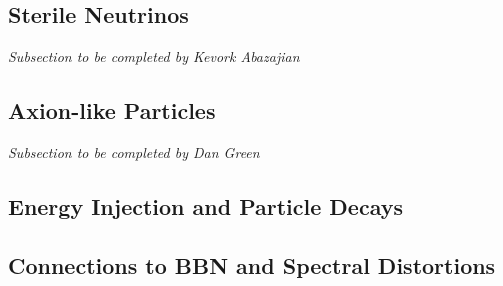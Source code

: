 \subsection{Sterile Neutrinos}

{\it Subsection to be completed by Kevork Abazajian}

\subsection{Axion-like Particles}

{\it Subsection to be completed by Dan Green}

\subsection{Energy Injection and Particle Decays}

\subsection{Connections to BBN and Spectral Distortions}






